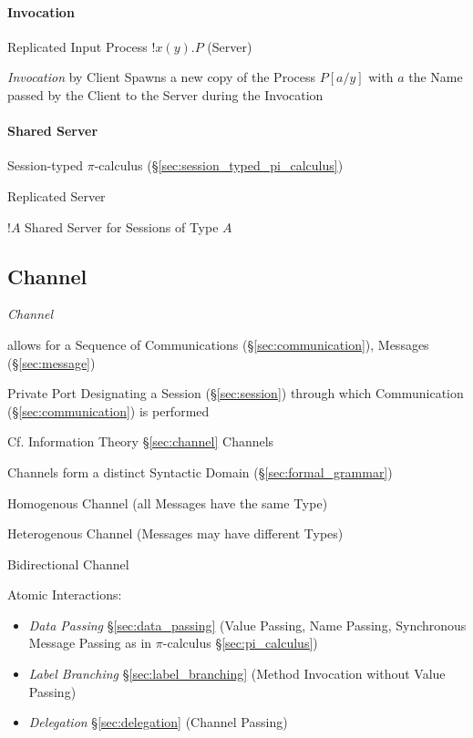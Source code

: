\paragraph{Invocation}\label{sec:invocation}\hfill

Replicated Input Process $!x(y).P$ (Server)

\emph{Invocation} by Client Spawns a new copy of the Process $P[a/y]$
with $a$ the Name passed by the Client to the Server during the
Invocation



\paragraph{Shared Server}\label{sec:shared_server}\hfill

Session-typed $\pi$-calculus (\S\ref{sec:session_typed_pi_calculus})

Replicated Server

$!A$ Shared Server for Sessions of Type $A$



\subsection{Channel}\label{sec:process_channel}

\emph{Channel}

allows for a Sequence of Communications (\S\ref{sec:communication}),
Messages (\S\ref{sec:message})

Private Port Designating a Session (\S\ref{sec:session}) through which
Communication (\S\ref{sec:communication}) is performed
\cite{honda-vasconcelos-kubo98}

\fist Cf. Information Theory \S\ref{sec:channel} Channels

Channels form a distinct Syntactic Domain (\S\ref{sec:formal_grammar})
\cite{honda-vasconcelos-kubo98}

Homogenous Channel (all Messages have the same Type)

Heterogenous Channel (Messages may have different Types)

Bidirectional Channel

Atomic Interactions:
\begin{itemize}
  \item \emph{Data Passing} \S\ref{sec:data_passing} (Value Passing,
    Name Passing, Synchronous Message Passing as in $\pi$-calculus
    \S\ref{sec:pi_calculus})
  \item \emph{Label Branching} \S\ref{sec:label_branching} (Method
    Invocation without Value Passing)
  \item \emph{Delegation} \S\ref{sec:delegation} (Channel Passing)
\end{itemize}

